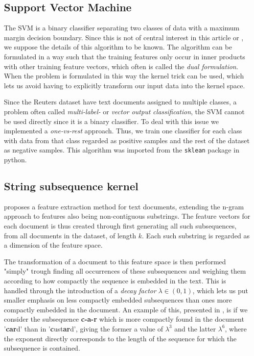 
\subsection{Support Vector Machine}
The SVM is a binary classifier separating two classes of data with a maximum margin decision boundary. Since this is not of central interest in this article or \cite{lodhi}, we suppose the details of this algorithm to be known. The algorithm can be formulated in a way such that the training features only occur in inner products with other training feature vectors, which often is called the \textit{dual formulation}. When the problem is formulated in this way the kernel trick can be used, which lets us avoid having to explicitly transform our input data into the kernel space. 

Since the Reuters dataset have text documents assigned to multiple classes, a problem often called\textit{ multi-label-} or \textit{vector output classification}, the SVM cannot be used directly since it is a binary classifier. To deal with this issue we implemented a \textit{one-vs-rest} approach. Thus, we train one classifier for each class with data from that class regarded as positive samples and the rest of the dataset as negative samples. This algorithm was imported from the \texttt{sklean} package in python. 

\subsection{String subsequence kernel}
\cite{lodhi} proposes a feature extraction method for text documents, extending the n-gram approach to features also being non-contiguous substrings. The feature vectors for each document is thus created through first generating all such subsequences, from all documents in the dataset, of length $ k $. Each such substring is regarded as a dimension of the feature space. 

The transformation of a document to this feature space is then performed "simply" trough finding all occurrences of these subsequences and weighing them according to how compactly the sequence is embedded in the text. This is handled through the introduction of a \textit{decay factor} $ \lambda \in (0,1) $, which lets us put smaller emphasis on less compactly embedded subsequences than ones more compactly embedded in the document. An example of this, presented in \cite{lodhi}, is if we consider the subsequence \textbf{c-a-r} which is more compactly found in the document '\textbf{car}d' than in   '\textbf{c}ust\textbf{ar}d', giving the former a value of $ \lambda^3 $ and the latter $ \lambda^6 $, where the exponent directly corresponds to the length of the sequence for which the subsequence is contained.

